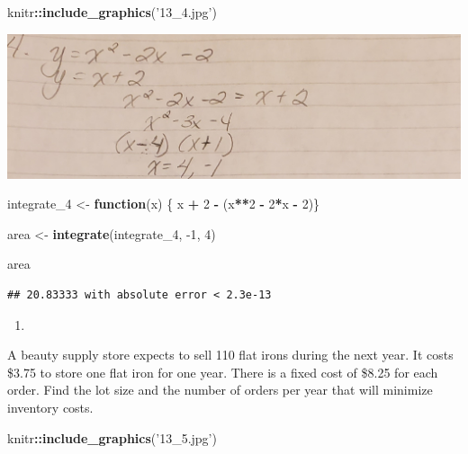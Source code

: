 \documentclass[
]{article}
\newenvironment{Shaded}{\begin{snugshade}}{\end{snugshade}}
\newcommand{\ControlFlowTok}[1]{\textcolor[rgb]{0.13,0.29,0.53}{\textbf{#1}}}
\newcommand{\DecValTok}[1]{\textcolor[rgb]{0.00,0.00,0.81}{#1}}
\newcommand{\KeywordTok}[1]{\textcolor[rgb]{0.13,0.29,0.53}{\textbf{#1}}}
\newcommand{\NormalTok}[1]{#1}
\newcommand{\OperatorTok}[1]{\textcolor[rgb]{0.81,0.36,0.00}{\textbf{#1}}}
\newcommand{\StringTok}[1]{\textcolor[rgb]{0.31,0.60,0.02}{#1}}
\begin{document}
\begin{Shaded}
\begin{Highlighting}[]
\NormalTok{knitr}\OperatorTok{::}\KeywordTok{include_graphics}\NormalTok{(}\StringTok{'13_4.jpg'}\NormalTok{)}
\end{Highlighting}
\end{Shaded}

\includegraphics[width=27.15in]{13_4}

\begin{Shaded}
\begin{Highlighting}[]
\NormalTok{integrate_}\DecValTok{4}\NormalTok{ <-}\StringTok{ }\ControlFlowTok{function}\NormalTok{(x) \{ x }\OperatorTok{+}\StringTok{ }\DecValTok{2} \OperatorTok{-}\StringTok{ }\NormalTok{(x}\OperatorTok{**}\DecValTok{2} \OperatorTok{-}\StringTok{ }\DecValTok{2}\OperatorTok{*}\NormalTok{x }\OperatorTok{-}\StringTok{ }\DecValTok{2}\NormalTok{)\}}

\NormalTok{area <-}\StringTok{ }\KeywordTok{integrate}\NormalTok{(integrate_}\DecValTok{4}\NormalTok{, }\DecValTok{-1}\NormalTok{, }\DecValTok{4}\NormalTok{)}

\NormalTok{area}
\end{Highlighting}
\end{Shaded}

\begin{verbatim}
## 20.83333 with absolute error < 2.3e-13
\end{verbatim}

\begin{enumerate}
\def\labelenumi{\arabic{enumi}.}
\setcounter{enumi}{4}
\item
\end{enumerate}

A beauty supply store expects to sell 110 flat irons during the next
year. It costs \$3.75 to store one flat iron for one year. There is a
fixed cost of \$8.25 for each order. Find the lot size and the number of
orders per year that will minimize inventory costs.

\begin{Shaded}
\begin{Highlighting}[]
\NormalTok{knitr}\OperatorTok{::}\KeywordTok{include_graphics}\NormalTok{(}\StringTok{'13_5.jpg'}\NormalTok{)}
\end{Highlighting}
\end{Shaded}
\end{document}
